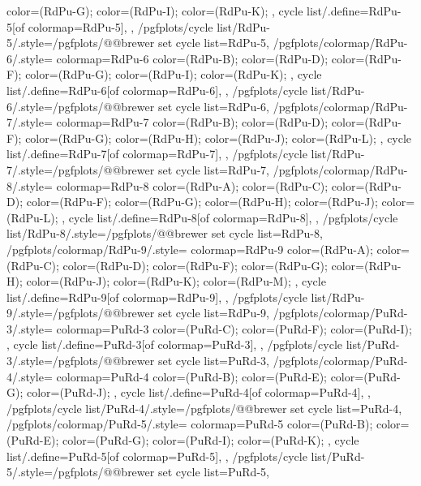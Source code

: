 {{{      color=(RdPu-G);
      color=(RdPu-I);
      color=(RdPu-K);
    },
    cycle list/.define={RdPu-5}{[of colormap=RdPu-5]},
  },
  /pgfplots/cycle list/RdPu-5/.style={/pgfplots/@@brewer set cycle list={RdPu-5}},
  /pgfplots/colormap/RdPu-6/.style={
    colormap={RdPu-6}{
      color=(RdPu-B);
      color=(RdPu-D);
      color=(RdPu-F);
      color=(RdPu-G);
      color=(RdPu-I);
      color=(RdPu-K);
    },
    cycle list/.define={RdPu-6}{[of colormap=RdPu-6]},
  },
  /pgfplots/cycle list/RdPu-6/.style={/pgfplots/@@brewer set cycle list={RdPu-6}},
  /pgfplots/colormap/RdPu-7/.style={
    colormap={RdPu-7}{
      color=(RdPu-B);
      color=(RdPu-D);
      color=(RdPu-F);
      color=(RdPu-G);
      color=(RdPu-H);
      color=(RdPu-J);
      color=(RdPu-L);
    },
    cycle list/.define={RdPu-7}{[of colormap=RdPu-7]},
  },
  /pgfplots/cycle list/RdPu-7/.style={/pgfplots/@@brewer set cycle list={RdPu-7}},
  /pgfplots/colormap/RdPu-8/.style={
    colormap={RdPu-8}{
      color=(RdPu-A);
      color=(RdPu-C);
      color=(RdPu-D);
      color=(RdPu-F);
      color=(RdPu-G);
      color=(RdPu-H);
      color=(RdPu-J);
      color=(RdPu-L);
    },
    cycle list/.define={RdPu-8}{[of colormap=RdPu-8]},
  },
  /pgfplots/cycle list/RdPu-8/.style={/pgfplots/@@brewer set cycle list={RdPu-8}},
  /pgfplots/colormap/RdPu-9/.style={
    colormap={RdPu-9}{
      color=(RdPu-A);
      color=(RdPu-C);
      color=(RdPu-D);
      color=(RdPu-F);
      color=(RdPu-G);
      color=(RdPu-H);
      color=(RdPu-J);
      color=(RdPu-K);
      color=(RdPu-M);
    },
    cycle list/.define={RdPu-9}{[of colormap=RdPu-9]},
  },
  /pgfplots/cycle list/RdPu-9/.style={/pgfplots/@@brewer set cycle list={RdPu-9}},
  /pgfplots/colormap/PuRd-3/.style={
    colormap={PuRd-3}{
      color=(PuRd-C);
      color=(PuRd-F);
      color=(PuRd-I);
    },
    cycle list/.define={PuRd-3}{[of colormap=PuRd-3]},
  },
  /pgfplots/cycle list/PuRd-3/.style={/pgfplots/@@brewer set cycle list={PuRd-3}},
  /pgfplots/colormap/PuRd-4/.style={
    colormap={PuRd-4}{
      color=(PuRd-B);
      color=(PuRd-E);
      color=(PuRd-G);
      color=(PuRd-J);
    },
    cycle list/.define={PuRd-4}{[of colormap=PuRd-4]},
  },
  /pgfplots/cycle list/PuRd-4/.style={/pgfplots/@@brewer set cycle list={PuRd-4}},
  /pgfplots/colormap/PuRd-5/.style={
    colormap={PuRd-5}{
      color=(PuRd-B);
      color=(PuRd-E);
      color=(PuRd-G);
      color=(PuRd-I);
      color=(PuRd-K);
    },
    cycle list/.define={PuRd-5}{[of colormap=PuRd-5]},
  },
  /pgfplots/cycle list/PuRd-5/.style={/pgfplots/@@brewer set cycle list={PuRd-5}},
}
